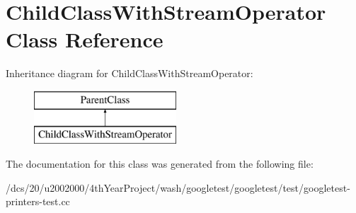 \hypertarget{classChildClassWithStreamOperator}{}\section{Child\+Class\+With\+Stream\+Operator Class Reference}
\label{classChildClassWithStreamOperator}
Inheritance diagram for Child\+Class\+With\+Stream\+Operator\+:\begin{figure}[H]
\begin{center}
\leavevmode
\includegraphics[height=2.000000cm]{classChildClassWithStreamOperator}
\end{center}
\end{figure}


The documentation for this class was generated from the following file\+:\begin{DoxyCompactItemize}
\item 
/dcs/20/u2002000/4th\+Year\+Project/wash/googletest/googletest/test/googletest-\/printers-\/test.\+cc\end{DoxyCompactItemize}
